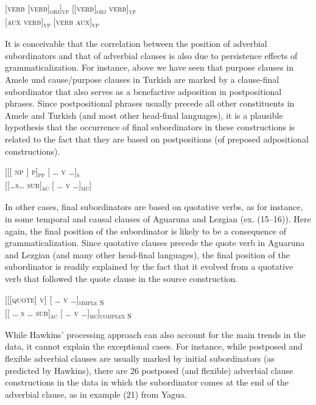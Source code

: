 \documentclass[output=paper]{langsci/langscibook}
\begin{document}
\ea\label{ex:key:}
[\textsc{verb}      \textsc{[verb]\textsubscript{obj}]\textsubscript{vp}}                                   \textsc{[[verb]\textsubscript{obj}}     \textsc{verb]\textsubscript{vp}}  \\
 
   \textsc{[aux}   \textsc{verb]\textsubscript{vp}}    \textsc{[verb}   \textsc{aux]\textsubscript{vp}}
\z

It is conceivable that the correlation between the position of adverbial subordinators and that of adverbial clauses is also due to persistence effects of grammaticalization. For instance, above we have seen that purpose clauses in Amele und cause/purpose clauses in Turkish are marked by a clause-final subordinator that also serves as a benefactive adposition in postpositional phrases. Since postpositional phrases usually precede all other constituents in Amele and Turkish (and most other head-final languages), it is a plausible hypothesis that the occurrence of final subordinators in these constructions is related to the fact that they are based on postpositions (of preposed adpositional constructions). 

\ea\label{ex:key:}
[[[ \textsc{np} ]     \textsc{p]\textsubscript{pp}}      [ \textsc{… v …]\textsubscript{s}}      \\
    \textsc{[[…s… sub]\textsubscript{ac}}  [ \textsc{… v …]\textsubscript{mc}}]   
\z

In other cases, final subordinators are based on quotative verbs, as for instance, in some temporal and causal clauses of Aguaruna and Lezgian (ex. (15–16)). Here again, the final position of the subordinator is likely to be a consequence of grammaticalization. Since quotative clauses precede the quote verb in Aguaruna and Lezgian (and many other head-final languages), the final position of the subordinator is readily explained by the fact that it evolved from a quotative verb that followed the quote clause in the source construction. 

\ea\label{ex:key:}
 [[\textsc{[quote]}   \textsc{v]}         [ \textsc{… v …]\textsubscript{simple S}}      \\{}
  [[ \textsc{… s … sub]\textsubscript{ac}}  [ \textsc{… v …]\textsubscript{mc}]\textsubscript{complex S}}   
\z

While Hawkins’ processing approach can also account for the main trends in the data, it cannot explain the exceptional cases. For instance, while postposed and flexible adverbial clauses are usually marked by initial subordinators (as predicted by Hawkins), there are 26 postposed (and flexible) adverbial clause constructions in the data in which the subordinator comes at the end of the adverbial clause, as in example (21) from Yagua.
\end{document}
